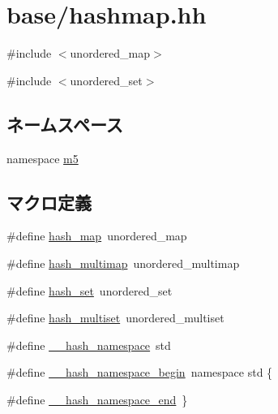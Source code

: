 \hypertarget{hashmap_8hh}{
\section{base/hashmap.hh}
\label{hashmap_8hh}
}
{\ttfamily \#include $<$unordered\_\-map$>$}\par
{\ttfamily \#include $<$unordered\_\-set$>$}\par
\subsection*{ネームスペース}
\begin{DoxyCompactItemize}
\item 
namespace \hyperlink{namespacem5}{m5}
\end{DoxyCompactItemize}
\subsection*{マクロ定義}
\begin{DoxyCompactItemize}
\item 
\#define \hyperlink{hashmap_8hh_ad06cc371f5697a73eab4c293546b4dba}{hash\_\-map}~unordered\_\-map
\item 
\#define \hyperlink{hashmap_8hh_a046c232424330722fc22de4526cf067b}{hash\_\-multimap}~unordered\_\-multimap
\item 
\#define \hyperlink{hashmap_8hh_adf357f1906b5e9496ca8792d88a3268e}{hash\_\-set}~unordered\_\-set
\item 
\#define \hyperlink{hashmap_8hh_ab4d29adf853d377a8a88515700d575ba}{hash\_\-multiset}~unordered\_\-multiset
\item 
\#define \hyperlink{hashmap_8hh_a753a3f3f4a7bc29763dc4931f699de56}{\_\-\_\-hash\_\-namespace}~std
\item 
\#define \hyperlink{hashmap_8hh_a6d9c8851148dfa7e5b7f65373c4eb87a}{\_\-\_\-hash\_\-namespace\_\-begin}~namespace std \{
\item 
\#define \hyperlink{hashmap_8hh_a1dc86c73a247ef8b54cdb9eff7aeb723}{\_\-\_\-hash\_\-namespace\_\-end}~\}
\end{DoxyCompactItemize}


